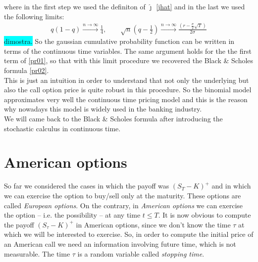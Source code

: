 where in the first step we used the definiton of $\hat{\jmath}$ \eqref{jhat} and in the last we used the following limits:
\begin{align}\label{lim}
    q(1-q)\overset{n\to\infty}{\longrightarrow}\frac{1}{4}, \qquad
    \sqrt{n}\left(q-\frac{1}{2}\right) \overset{n\to\infty}{\longrightarrow}\frac{\left(r-\frac{\sigma}{2}\sqrt{T}\right)}{2\sigma}
\end{align}
\colorbox{cyan}{dimostra.} So the gaussian cumulative probability function can be written in terms of the continuous time variables. The same argument holds for the the first term of \eqref{pr01}, so that with this limit procedure we recovered the Black \& Scholes formula \eqref{pr02}.\\
This is just an intuition in order to understand that not only the underlying but also the call option price is quite robust in this procedure. So the binomial model approximates very well the continuous time pricing model and this is the reason why nowadays this model is widely used in the banking industry.\\
We will came back to the Black \& Scholes formula after introducing the stochastic calculus in continuous time.

\section{American options} %
So far we considered the cases in which the payoff was $(S_T-K)^+$ and in which we can exercise the option to buy/sell only at the maturity. These options are called \emph{European options}. On the contrary, in \emph{American options} we can exercise the option -- i.e. the possibility -- at any time $t\le T$. It is now obvious to compute the payoff $(S_{\tau}-K)^+$ in American options, since we don't know the time $\tau$ at which we will be interested to exercise. So, in order to compute the initial price of an American call we need an information involving future time, which is not measurable. The time $\tau$ is a random variable called \emph{stopping time}.

